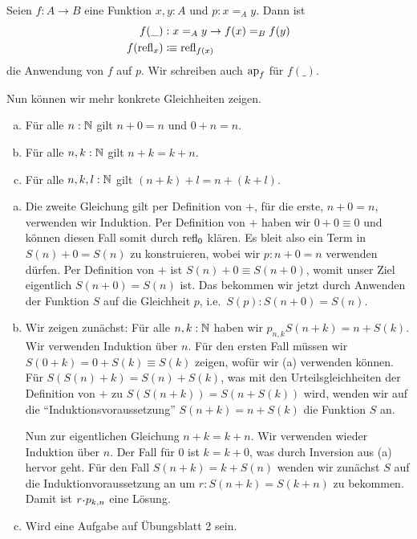 \begin{definition}
  Seien $f:A\to B$ eine Funktion $x,y:A$ und $ p:x=_Ay$.
  Dann ist
  \begin{align*}
    f(\_) &: x=_Ay\to f(x)=_Bf(y) \\
    f(\mathrm{refl}_x)&\vcentcolon\mspace{-1.2mu}\equiv \mathrm{refl}_{f(x)}
  \end{align*}
  die Anwendung von $f$ auf $ p$. Wir schreiben auch $\mathrm{ap}_f$ für $f(\_)$.
\end{definition}

Nun können wir mehr konkrete Gleichheiten zeigen.

\begin{lemma}
\begin{enumerate}[(a)]
\item Für alle $n:\mathbb{N}$ gilt $n+0=n$ und $0+n=n$.
\item Für alle $n,k:\mathbb{N}$ gilt $n+k=k+n$.
\item Für alle $n,k,l:\mathbb{N}$ gilt $(n+k)+l=n+(k+l)$.
\end{enumerate}
\end{lemma}
\begin{beweis}
\begin{enumerate}[(a)]
\item Die zweite Gleichung gilt per Definition von $+$,
  für die erste, $n+0=n$, verwenden wir Induktion.
  Per Definition von $+$ haben wir $0+0\equiv 0$ und können diesen Fall somit durch $\mathrm{refl}_0$ klären.
  Es bleit also ein Term in $S(n)+0=S(n)$ zu konstruieren, wobei wir $ p:n+0=n$ verwenden dürfen.
  Per Definition von $+$ ist $S(n)+0\equiv S(n+0)$, womit unser Ziel eigentlich $S(n+0)=S(n)$ ist.
  Das bekommen wir jetzt durch Anwenden der Funktion $S$ auf die Gleichheit $ p$, i.e.\ $S( p):S(n+0)=S(n)$.
\item Wir zeigen zunächst: Für alle $n,k:\mathbb{N}$ haben wir $ p_{n,k}S(n+k)=n+S(k)$.
  Wir verwenden Induktion über $n$.
  Für den ersten Fall müssen wir $S(0+k)=0+S(k)\equiv S(k)$ zeigen, wofür wir (a) verwenden können.
  Für $S(S(n)+k)=S(n)+S(k)$,
  was mit den Urteilsgleichheiten der Definition von $+$ zu $S(S(n+k))=S(n+S(k))$ wird,
  wenden wir auf die ``Induktionsvoraussetzung'' $S(n+k)=n+S(k)$ die Funktion $S$ an.

  Nun zur eigentlichen Gleichung $n+k=k+n$.
  Wir verwenden wieder Induktion über $n$.
  Der Fall für $0$ ist $k=k+0$, was durch Inversion aus (a) hervor geht.
  Für den Fall $S(n+k)=k+S(n)$ wenden wir zunächst $S$
  auf die Induktionvoraussetzung an um $ r:S(n+k)=S(k+n)$ zu bekommen.
  Damit ist $ r\kon p_{k,n}$ eine Lösung.
\item Wird eine Aufgabe auf Übungsblatt 2 sein.
\end{enumerate}
\end{beweis}

